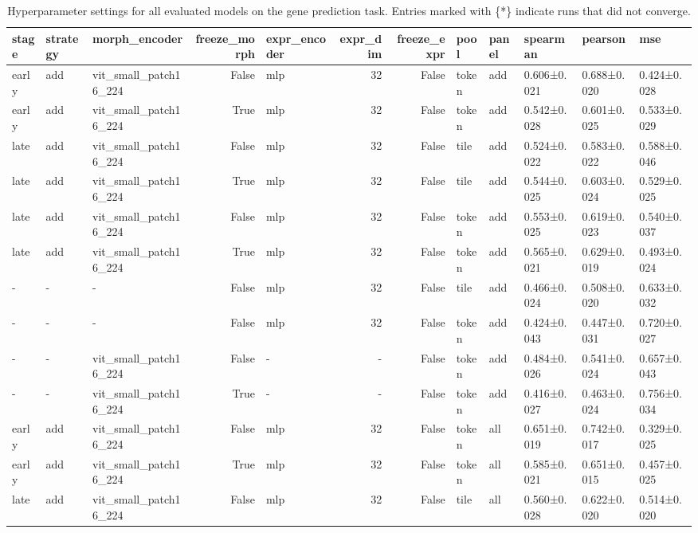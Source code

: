 \begin{table}
  \centering
  \scriptsize
\caption{Hyperparameter settings for all evaluated models on the gene prediction task. Entries marked with \{*\} indicate runs that did not converge.}
\label{tab:p-fus:cell-table}

\begin{tabular}{lllrlrrlllll}
\toprule
stage & strategy & morph\_encoder & freeze\_morph & expr\_encoder & expr\_dim & freeze\_expr & pool & panel & spearman & pearson & mse \\
\midrule
early & add & vit\_small\_patch16\_224 & False & mlp & 32 & False & token & add & 0.606±0.021 & 0.688±0.020 & 0.424±0.028 \\
early & add & vit\_small\_patch16\_224 & True & mlp & 32 & False & token & add & 0.542±0.028 & 0.601±0.025 & 0.533±0.029 \\
late & add & vit\_small\_patch16\_224 & False & mlp & 32 & False & tile & add & 0.524±0.022 & 0.583±0.022 & 0.588±0.046 \\
late & add & vit\_small\_patch16\_224 & True & mlp & 32 & False & tile & add & 0.544±0.025 & 0.603±0.024 & 0.529±0.025 \\
late & add & vit\_small\_patch16\_224 & False & mlp & 32 & False & token & add & 0.553±0.025 & 0.619±0.023 & 0.540±0.037 \\
late & add & vit\_small\_patch16\_224 & True & mlp & 32 & False & token & add & 0.565±0.021 & 0.629±0.019 & 0.493±0.024 \\
- & - & - & False & mlp & 32 & False & tile & add & 0.466±0.024 & 0.508±0.020 & 0.633±0.032 \\
- & - & - & False & mlp & 32 & False & token & add & 0.424±0.043 & 0.447±0.031 & 0.720±0.027 \\
- & - & vit\_small\_patch16\_224 & False & - & - & False & token & add & 0.484±0.026 & 0.541±0.024 & 0.657±0.043 \\
- & - & vit\_small\_patch16\_224 & True & - & - & False & token & add & 0.416±0.027 & 0.463±0.024 & 0.756±0.034 \\
early & add & vit\_small\_patch16\_224 & False & mlp & 32 & False & token & all & 0.651±0.019 & 0.742±0.017 & 0.329±0.025 \\
early & add & vit\_small\_patch16\_224 & True & mlp & 32 & False & token & all & 0.585±0.021 & 0.651±0.015 & 0.457±0.025 \\
late & add & vit\_small\_patch16\_224 & False & mlp & 32 & False & tile & all & 0.560±0.028 & 0.622±0.020 & 0.514±0.020 \\

\end{tabular}
\end{table}
